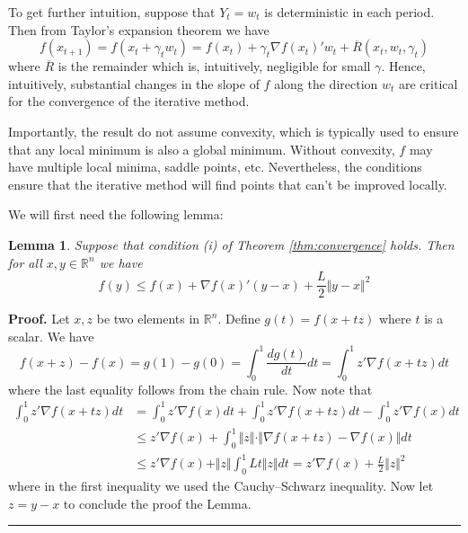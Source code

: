\documentclass[letter,11pt]{article}
\newtheorem{lemma}{Lemma}[section]
\newenvironment {proof}[1][Proof]{\noindent \textbf {#1.} }{\ \rule {0.5em}{0.5em}}
\begin{document}
To get further intuition, suppose that $Y_{t} = w_{t}$ is deterministic in each period. Then from Taylor's expansion theorem we have  
$$f(x_{t+1}) = f(x_{t} + \gamma_{t}w_{t}) = f(x_{t}) + \gamma_{t}\nabla f(x_{t})'w_{t} +\overline{R}(x_{t},w_{t},\gamma_{t})$$
where $\overline{R}$ is the remainder which is, intuitively, negligible for small $\gamma$. Hence, intuitively, substantial changes in the slope  of $f$ along the direction $w_{t}$ are critical for the convergence of the iterative method. 

Importantly, the result do not assume convexity, which is typically used to ensure that any local minimum is also a global minimum. Without convexity, \( f \) may have multiple local minima, saddle points, etc. Nevertheless, the conditions ensure that the iterative method will find points that can't be improved locally. 

We will first need the following lemma: 

\begin{lemma} \label{Lemma:Dominate}
    Suppose that condition (i) of Theorem \ref{thm:convergence} holds. Then for all $x,y \in \mathbb{R}^{n}$ we have  
    \begin{equation*} \label{Eq:Lip1}
         f(y) \leq f(x) +\nabla f(x) ' (y-x) + \frac{L}{2} \Vert y-x \Vert^{2}
          \end{equation*}
          \end{lemma}

       \begin{proof}
          Let $x,z$ be two elements in $\mathbb{R}^{n}$.  Define $g(t) = f(x+tz)$ where $t$ is a scalar. We have 
$$ f(x+z) - f(x) = g(1) - g(0) = \int_{0}^{1} \frac{d g(t) }{dt} dt = \int _{0}^{1} z' \nabla f(x+tz) dt$$
    where the last equality follows from the chain rule.  Now note that 
    \begin{align*}
        \int _{0}^{1} z' \nabla f(x+tz) dt  & =    \int _{0}^{1} z' \nabla f(x) dt +   \int _{0}^{1} z' \nabla f(x+tz) dt -    \int _{0}^{1} z' \nabla f(x) dt   \\
        & \leq  z' \nabla f(x)  + \int _{0}^{1} \Vert z \Vert \cdot \Vert \nabla f(x+tz)  - \nabla f(x) \Vert dt \\
        & \leq  z' \nabla f(x) +\Vert z \Vert  \int _{0}^{1} Lt\Vert z \Vert dt = z' \nabla f(x) +\frac{L}{2} \Vert z \Vert ^{2}
         \end{align*}
where in the first inequality we used the Cauchy–Schwarz inequality. Now let $z=y-x$ to conclude the proof the Lemma. 
       \end{proof}   
\end{document}
